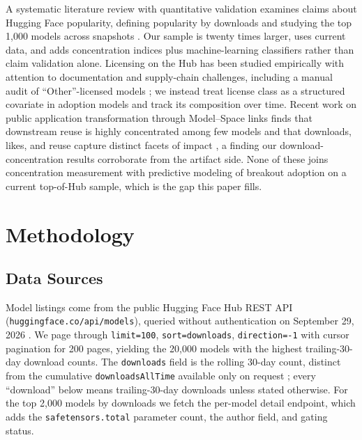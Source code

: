 \documentclass[conference]{IEEEtran}
\begin{document}
A systematic literature review with quantitative validation examines claims
about Hugging Face popularity, defining popularity by downloads and studying
the top 1,000 models across snapshots \cite{hf-lit-review}. Our sample is
twenty times larger, uses current data, and adds concentration indices plus
machine-learning classifiers rather than claim validation alone. Licensing on
the Hub has been studied empirically with attention to documentation and
supply-chain challenges, including a manual audit of ``Other''-licensed
models \cite{hf-licensing}; we instead treat license class as a structured
covariate in adoption models and track its composition over time. Recent work
on public application transformation through Model--Space links finds that
downstream reuse is highly concentrated among few models and that downloads,
likes, and reuse capture distinct facets of impact \cite{hf-reuse}, a finding
our download-concentration results corroborate from the artifact side. None of
these joins concentration measurement with predictive modeling of breakout
adoption on a current top-of-Hub sample, which is the gap this paper fills.

\section{Methodology}
\subsection{Data Sources}
Model listings come from the public Hugging Face Hub REST API
(\texttt{huggingface.co/api/models}), queried without authentication on
September 29, 2026 \cite{hf-api}. We page through \texttt{limit=100},
\texttt{sort=downloads}, \texttt{direction=-1} with cursor pagination for 200
pages, yielding the 20,000 models with the highest trailing-30-day download
counts. The \texttt{downloads} field is the rolling 30-day count, distinct
from the cumulative \texttt{downloadsAllTime} available only on request
\cite{hf-hub-docs}; every ``download'' below means trailing-30-day downloads
unless stated otherwise. For the top 2,000 models by downloads we fetch the
per-model detail endpoint, which adds the \texttt{safetensors.total}
parameter count, the author field, and gating status.
\end{document}
